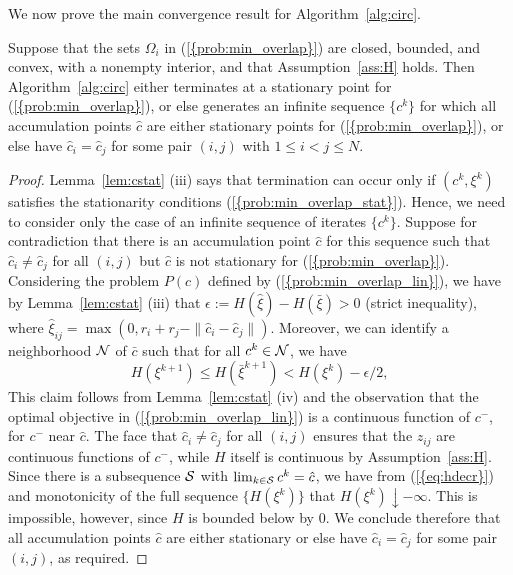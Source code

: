 \documentclass{siamltex}
\begin{document}
We now prove the main convergence result for Algorithm~\ref{alg:circ}.

\begin{theorem} \label{th:circ} Suppose that the sets $\Omega_i$ in
  {(\ref{{prob:min_overlap}})} are closed, bounded, and convex, with a
  nonempty interior, and that Assumption~\ref{ass:H} holds. Then
  Algorithm~\ref{alg:circ} either terminates at a stationary point for
  {(\ref{{prob:min_overlap}})}, or else  generates an infinite sequence
  $\{ c^k \}$ for which all accumulation points $\hat{c}$ are either
  stationary points for {(\ref{{prob:min_overlap}})}, or else have
  $\hat{c}_i=\hat{c}_j$ for some pair $(i,j)$ with $1 \le i < j \le
  N$.
\end{theorem}
\begin{proof}
  Lemma~\ref{lem:cstat} (iii) says that termination can occur only if
  $(c^k,\xi^k)$ satisfies the stationarity conditions
  {(\ref{{prob:min_overlap_stat}})}.  Hence, we need to consider only the
  case of an infinite sequence of iterates $\{ c^k \}$.  Suppose for
  contradiction that there is an accumulation point $\hat{c}$ for this
  sequence such that $\hat{c}_i \neq \hat{c}_j$ for all $(i,j)$ but
  $\hat{c}$ is not stationary for
  {(\ref{{prob:min_overlap}})}. Considering the problem $P(\hat{c})$
  defined by {(\ref{{prob:min_overlap_lin}})}, we have by
  Lemma~\ref{lem:cstat} (iii) that $\epsilon := H(\hat{\xi}) -
  H(\bar{\xi})>0$ (strict inequality), where $\hat{\xi}_{ij} = \max
  (0, r_i+r_j-\|\hat{c}_i-\hat{c}_j\|)$. Moreover, we can identify a
  neighborhood ${{\cal N}}$ of $\bar{c}$ such that for all $c^k \in {{\cal N}}$, we
  have
\begin{equation} \label{eq:hdecr}
H(\xi^{k+1}) \le H(\bar{\xi}^{k+1}) < H(\xi^k) - \epsilon/2, 
\end{equation}
This claim follows from Lemma~\ref{lem:cstat} (iv) and the observation that
the optimal objective in {(\ref{{prob:min_overlap_lin}})} is a continuous
function of $c^-$, for $c^-$ near $\hat{c}$. The face that $\hat{c}_i \neq
\hat{c}_j$ for all $(i,j)$ ensures that the $z_{ij}$ are continuous
functions of $c^-$, while $H$ itself is continuous by
Assumption~\ref{ass:H}. Since there is a subsequence ${{\cal S}}$ with
$\lim_{k \in {{\cal S}}} c^k=\hat{c}$, we have from {(\ref{{eq:hdecr}})} and
monotonicity of the full sequence $\{ H(\xi^k) \}$ that $H(\xi^k)
\downarrow -\infty$. This is impossible, however, since $H$ is bounded
below by $0$. We conclude therefore that all accumulation points
$\hat{c}$ are either stationary or else have $\hat{c}_i=\hat{c}_j$ for
some pair $(i,j)$, as required. 
\end{proof}
\end{document}
